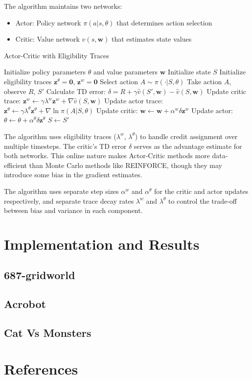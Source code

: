 \documentclass{article}
\begin{document}
The algorithm maintains two networks:
\begin{itemize}
    \item Actor: Policy network $\pi(a|s,\theta)$ that determines action selection
    \item Critic: Value network $\hat{v}(s,\mathbf{w})$ that estimates state values
\end{itemize}

\begin{algorithm}
\caption{Actor-Critic with Eligibility Traces}
\begin{algorithmic}[1]
\State Initialize policy parameters $\theta$ and value parameters $\mathbf{w}$
    \State Initialize state $S$
    \State Initialize eligibility traces $\mathbf{z}^\theta = \mathbf{0}$, $\mathbf{z}^w = \mathbf{0}$
        \State Select action $A \sim \pi(\cdot|S,\theta)$
        \State Take action $A$, observe $R$, $S'$
        \State Calculate TD error: $\delta = R + \gamma\hat{v}(S',\mathbf{w}) - \hat{v}(S,\mathbf{w})$
        \State Update critic trace: $\mathbf{z}^w \leftarrow \gamma\lambda^w\mathbf{z}^w + \nabla\hat{v}(S,\mathbf{w})$
        \State Update actor trace: $\mathbf{z}^\theta \leftarrow \gamma\lambda^\theta\mathbf{z}^\theta + \nabla\ln\pi(A|S,\theta)$
        \State Update critic: $\mathbf{w} \leftarrow \mathbf{w} + \alpha^w\delta\mathbf{z}^w$
        \State Update actor: $\theta \leftarrow \theta + \alpha^\theta\delta\mathbf{z}^\theta$
        \State $S \leftarrow S'$
    \EndWhile
\EndFor
\end{algorithmic}
\end{algorithm}

The algorithm uses eligibility traces ($\lambda^w$, $\lambda^\theta$) to handle credit assignment over multiple timesteps. The critic's TD error $\delta$ serves as the advantage estimate for both networks. This online nature makes Actor-Critic methods more data-efficient than Monte Carlo methods like REINFORCE, though they may introduce some bias in the gradient estimates.

The algorithm uses separate step sizes $\alpha^w$ and $\alpha^\theta$ for the critic and actor updates respectively, and separate trace decay rates $\lambda^w$ and $\lambda^\theta$ to control the trade-off between bias and variance in each component.

\section{Implementation and Results}

\subsection{687-gridworld}

\subsection{Acrobot}

\subsection{Cat Vs Monsters}




\section{References}
\end{document}
